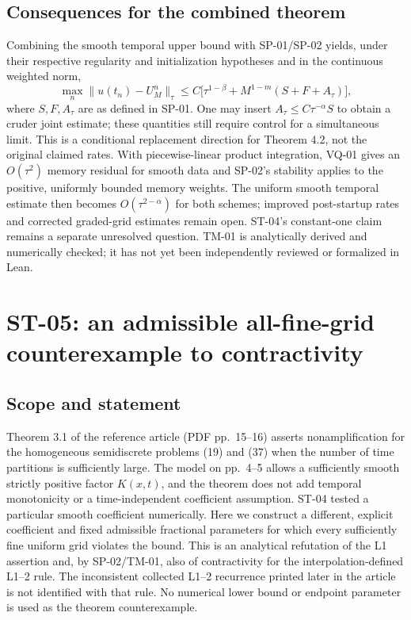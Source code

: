 \documentclass[11pt,a4paper]{amsart}
\theoremstyle{remark}
\theoremstyle{plain}
\theoremstyle{remark}
\numberwithin{equation}{section}
\begin{document}
\subsection{Consequences for the combined theorem}
Combining the smooth temporal upper bound with SP-01/SP-02 yields, under their respective regularity and initialization hypotheses and in the continuous weighted norm,
\[
 \max_n\|u(t_n)-U_M^n\|_\tau
 \le C\big[\tau^{1-\beta}+M^{1-m}(S+F+A_\tau)\big],
\]
where $S,F,A_\tau$ are as defined in SP-01. One may insert $A_\tau\le C\tau^{-\alpha}S$ to obtain a cruder joint estimate; these quantities still require control for a simultaneous limit. This is a conditional replacement direction for Theorem 4.2, not the original claimed rates. With piecewise-linear product integration, VQ-01 gives an $O(\tau^2)$ memory residual for smooth data and SP-02's stability applies to the positive, uniformly bounded memory weights. The uniform smooth temporal estimate then becomes $O(\tau^{2-\alpha})$ for both schemes; improved post-startup rates and corrected graded-grid estimates remain open. ST-04's constant-one claim remains a separate unresolved question. TM-01 is analytically derived and numerically checked; it has not yet been independently reviewed or formalized in Lean.


\section{ST-05: an admissible all-fine-grid counterexample to contractivity}
\label{sec:st05}

\subsection{Scope and statement}
Theorem 3.1 of the reference article (PDF pp.~15--16) asserts nonamplification for the homogeneous semidiscrete problems (19) and (37) when the number of time partitions is sufficiently large. The model on pp.~4--5 allows a sufficiently smooth strictly positive factor $K(x,t)$, and the theorem does not add temporal monotonicity or a time-independent coefficient assumption. ST-04 tested a particular smooth coefficient numerically. Here we construct a different, explicit coefficient and fixed admissible fractional parameters for which every sufficiently fine uniform grid violates the bound. This is an analytical refutation of the L1 assertion and, by SP-02/TM-01, also of contractivity for the interpolation-defined L1--2 rule. The inconsistent collected L1--2 recurrence printed later in the article is not identified with that rule. No numerical lower bound or endpoint parameter is used as the theorem counterexample.
\end{document}
